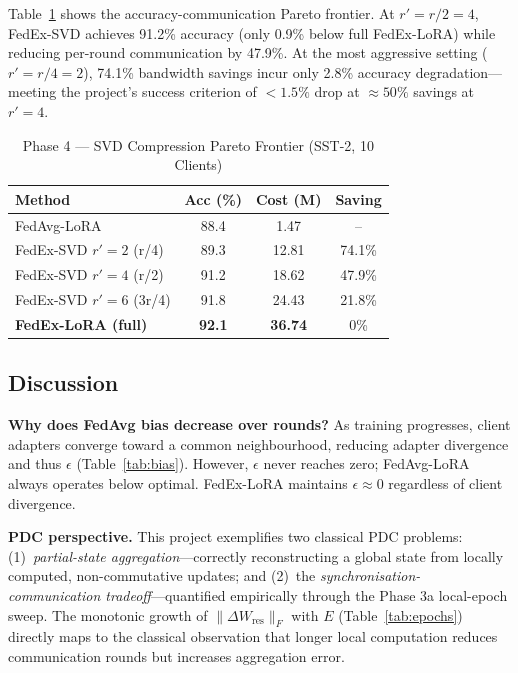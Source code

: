 \documentclass[conference]{IEEEtran}
\begin{document}
Table~\ref{tab:svd} shows the accuracy-communication Pareto frontier.
At $r'{=}r/2{=}4$, FedEx-SVD achieves 91.2\% accuracy (only 0.9\% below full
FedEx-LoRA) while reducing per-round communication by 47.9\%. At the most
aggressive setting ($r'{=}r/4{=}2$), 74.1\% bandwidth savings incur only 2.8\%
accuracy degradation---meeting the project's success criterion of ${<}1.5\%$
drop at ${\approx}50\%$ savings at $r'{=}4$.

\begin{table}[t]
\caption{Phase 4 — SVD Compression Pareto Frontier (SST-2, 10 Clients)}
\label{tab:svd}
\begin{center}
\begin{tabular}{|l|c|c|c|}
\hline
\textbf{Method} & \textbf{Acc (\%)} & \textbf{Cost (M)} & \textbf{Saving}\\
\hline
FedAvg-LoRA              & 88.4 &  1.47 & -- \\
FedEx-SVD $r'{=}2$ (r/4) & 89.3 & 12.81 & 74.1\% \\
FedEx-SVD $r'{=}4$ (r/2) & 91.2 & 18.62 & 47.9\% \\
FedEx-SVD $r'{=}6$ (3r/4)& 91.8 & 24.43 & 21.8\% \\
\textbf{FedEx-LoRA (full)}& \textbf{92.1} & \textbf{36.74} & 0\% \\
\hline
\end{tabular}
\end{center}
\end{table}

\subsection{Discussion}

\textbf{Why does FedAvg bias decrease over rounds?}
As training progresses, client adapters converge toward a common
neighbourhood, reducing adapter divergence and thus $\epsilon$
(Table~\ref{tab:bias}). However, $\epsilon$ never reaches zero; FedAvg-LoRA
always operates below optimal. FedEx-LoRA maintains $\epsilon\approx0$
regardless of client divergence.

\textbf{PDC perspective.}
This project exemplifies two classical PDC problems: (1)~\emph{partial-state
aggregation}---correctly reconstructing a global state from locally computed,
non-commutative updates; and (2)~the \emph{synchronisation-communication
tradeoff}---quantified empirically through the Phase 3a local-epoch sweep.
The monotonic growth of $\|\Delta W_{\mathrm{res}}\|_F$ with $E$
(Table~\ref{tab:epochs}) directly maps to the classical observation that
longer local computation reduces communication rounds but increases
aggregation error.
\end{document}
